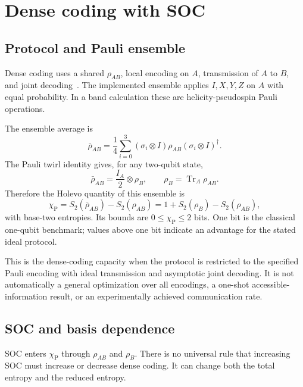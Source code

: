 \documentclass[11pt]{article}
\newcommand{\tr}{\operatorname{Tr}}
\begin{document}
\section{Dense coding with SOC}
\label{sec:dense_coding}

\subsection{Protocol and Pauli ensemble}

Dense coding uses a shared $\rho_{AB}$, local encoding on $A$, transmission of $A$ to $B$, and joint decoding~\cite{BennettWiesner1992,Bruss2004}. The implemented ensemble applies $I,X,Y,Z$ on $A$ with equal probability. In a band calculation these are helicity-pseudospin Pauli operations.

The ensemble average is
\begin{equation}
\bar\rho_{AB}=\frac14\sum_{i=0}^{3}
(\sigma_i\otimes I)\rho_{AB}(\sigma_i\otimes I)^\dagger.
\end{equation}
The Pauli twirl identity gives, for any two-qubit state,
\begin{equation}
\bar\rho_{AB}=\frac{I_A}{2}\otimes\rho_B,
\qquad \rho_B=\tr_A\rho_{AB}.
\label{eq:pauli_twirl}
\end{equation}
Therefore the Holevo quantity of this ensemble is
\begin{equation}
\boxed{
\chi_{\mathrm P}
=S_2(\bar\rho_{AB})-S_2(\rho_{AB})
=1+S_2(\rho_B)-S_2(\rho_{AB}),
}
\label{eq:holevo}
\end{equation}
with base-two entropies. Its bounds are $0\leq\chi_{\mathrm P}\leq2$ bits. One bit is the classical one-qubit benchmark; values above one bit indicate an advantage for the stated ideal protocol.

This is the dense-coding capacity when the protocol is restricted to the specified Pauli encoding with ideal transmission and asymptotic joint decoding. It is not automatically a general optimization over all encodings, a one-shot accessible-information result, or an experimentally achieved communication rate.

\subsection{SOC and basis dependence}

SOC enters $\chi_{\mathrm P}$ through $\rho_{AB}$ and $\rho_B$. There is no universal rule that increasing SOC must increase or decrease dense coding. It can change both the total entropy and the reduced entropy.
\end{document}
